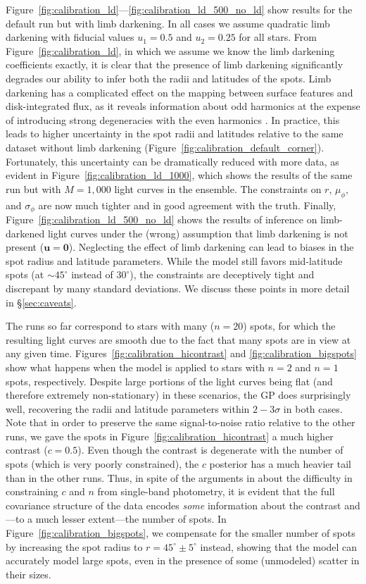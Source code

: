 \documentclass[modern,linenumbers]{aastex62}
\begin{document}
Figure~\ref{fig:calibration_ld}---\ref{fig:calibration_ld_500_no_ld}
show results for the default run but with limb darkening. In all cases
we assume quadratic limb darkening with fiducial values $u_1 = 0.5$
and $u_2 = 0.25$ for all stars. From Figure~\ref{fig:calibration_ld}, in which we
assume we know the limb darkening coefficients exactly, it is clear that
the presence of limb darkening significantly degrades our ability to
infer both the radii and latitudes of the spots. Limb darkening has a complicated
effect on the mapping between surface features and disk-integrated flux, as it
reveals information about odd harmonics at
the expense of introducing strong degeneracies with the even harmonics
. In practice, this leads to higher uncertainty in
the spot radii and latitudes relative to the same dataset without limb
darkening (Figure~\ref{fig:calibration_default_corner}). Fortunately,
this uncertainty can be dramatically reduced with more data, as evident
in Figure~\ref{fig:calibration_ld_1000}, which shows the results of the
same run but with $M=1{,}000$ light curves in the ensemble. The constraints
on $r$, $\mu_\phi$, and $\sigma_\phi$ are now much tighter and in
good agreement with the truth. Finally, Figure~\ref{fig:calibration_ld_500_no_ld}
shows the results of inference on limb-darkened light curves under the
(wrong) assumption that limb darkening is not present ($\mathbf{u} = \mathbf{0}$).
Neglecting the effect of limb darkening can lead to biases in the spot radius
and latitude parameters. While the model still favors mid-latitude spots
(at $\sim 45^\circ$ instead of $30^\circ$), the constraints are deceptively tight
and discrepant by many standard deviations. We discuss these points in
more detail in \S\ref{sec:caveats}.

The runs so far correspond to stars with many ($n = 20$) spots, for which the
resulting light curves are smooth due to the fact that many spots are in
view at any given time. Figures~\ref{fig:calibration_hicontrast} and
\ref{fig:calibration_bigspots} show what happens when the model is applied to
stars with $n=2$ and $n=1$ spots, respectively. Despite large portions of the
light curves being flat (and therefore extremely non-stationary)
in these scenarios, the GP does surprisingly well, recovering the radii
and latitude parameters within $2-3\sigma$ in both cases.
Note that in order to preserve the same signal-to-noise ratio relative to
the other runs, we gave the spots in Figure~\ref{fig:calibration_hicontrast}
a much higher contrast ($c = 0.5$). Even though the contrast is degenerate
with the number of spots (which is very poorly constrained), the $c$ posterior
has a much heavier tail than in the other runs.
Thus, in spite of the arguments in \citet{PaperI} about the difficulty in
constraining $c$ and $n$ from single-band photometry, it is evident that
the full covariance structure of the data encodes \emph{some} information
about the contrast and---to a much lesser extent---the number of spots.
In Figure~\ref{fig:calibration_bigspots}, we compensate for the smaller number
of spots by increasing the spot radius to $r = 45^\circ \pm 5^\circ$ instead,
showing that the model can accurately model large spots, even in the
presence of some (unmodeled) scatter in their sizes.
\end{document}
